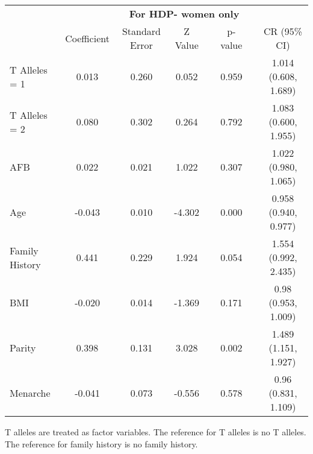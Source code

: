 \documentclass{standalone}
\begin{document}
\begin{threeparttable}
\begin{tabular}{@{}lccccccc@{}}
  \\
    & \multicolumn{7}{c}{\textbf{For HDP- women only}} \\
   \cmidrule{2-8}
   & Coefficient & Standard Error & Z Value & \hspace{1em} & p-value & \hspace{1em} & CR (95\% CI) \\ 
   \midrule
  T Alleles = 1\phantom{hdpxx} & 0.013 & 0.260 & 0.052 && 0.959 && 1.014 (0.608, 1.689) \\ 
  T Alleles = 2 & 0.080 & 0.302 & 0.264 && 0.792 && 1.083 (0.600, 1.955) \\ 
  AFB & 0.022 & 0.021 & 1.022 && 0.307 && 1.022 (0.980, 1.065) \\ 
  Age & -0.043 & 0.010 & -4.302 && 0.000 && 0.958 (0.940, 0.977) \\ 
  Family History & 0.441 & 0.229 & 1.924 && 0.054 && 1.554 (0.992, 2.435) \\ 
  BMI & -0.020 & 0.014 & -1.369 && 0.171 && 0.98 (0.953, 1.009) \\ 
  Parity & 0.398 & 0.131 & 3.028 && 0.002 && 1.489 (1.151, 1.927) \\ 
  Menarche & -0.041 & 0.073 & -0.556 && 0.578 && 0.96 (0.831, 1.109) \\
   \bottomrule
\end{tabular}
\captionsetup{justification   = raggedright,
              singlelinecheck = false}
\caption*{T alleles are treated as factor variables. The reference for T alleles is no T alleles. The reference for family history is no family history.}
\end{threeparttable}
\end{document}
